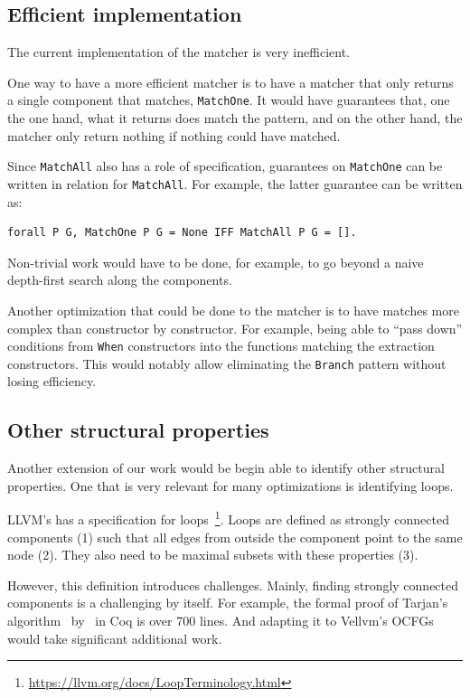 \documentclass[11pt]{article}
\newcommand{\inlinecoq}[1]{\mbox{\lstinline[style=customcoq,columns=fixed,basewidth=.48em]{#1}}}
\newcommand{\ilc}[1]{\inlinecoq{#1}}
\newcommand{\ocfg}{OCFG\xspace}
\begin{document}
\subsection{Efficient implementation}

The current implementation of the matcher is very inefficient.

One way to have a more efficient matcher is to have a matcher that only returns a single component that matches, \ilc{MatchOne}. It would have guarantees that, one the one hand, what it returns does match the pattern, and on the other hand, the matcher only return nothing if nothing could have matched. %

Since \ilc{MatchAll} also has a role of specification, guarantees on \ilc{MatchOne} can be written in relation for \ilc{MatchAll}. For example, the latter guarantee can be written as:
\begin{lstlisting}[style=customcoq,basicstyle=\small\ttfamily]
forall P G, MatchOne P G = None IFF MatchAll P G = [].
\end{lstlisting}
Non-trivial work would have to be done, for example, to go beyond a naive depth-first search along the components.

Another optimization that could be done to the matcher is to have matches more complex than constructor by constructor. For example, being able to ``pass down'' conditions from \ilc{When} constructors into the functions matching the extraction constructors. This would notably allow eliminating the \ilc{Branch} pattern without losing efficiency.

\subsection{Other structural properties}

Another extension of our work would be begin able to identify other structural properties. One that is very relevant for many optimizations is identifying loops.

LLVM's has a specification for loops~\footnote{\url{https://llvm.org/docs/LoopTerminology.html}}. Loops are defined as strongly connected components (1) such that all edges from outside the component point to the same node (2). They also need to be maximal subsets with these properties (3).

However, this definition introduces challenges. Mainly, finding strongly connected components is a challenging by itself. For example, the formal proof of Tarjan's algorithm~\cite{Tarjan} by~\citet{FormalTrajan} in Coq is over 700 lines. And adapting it to Vellvm's \ocfg{}s would take significant additional work.
\end{document}

